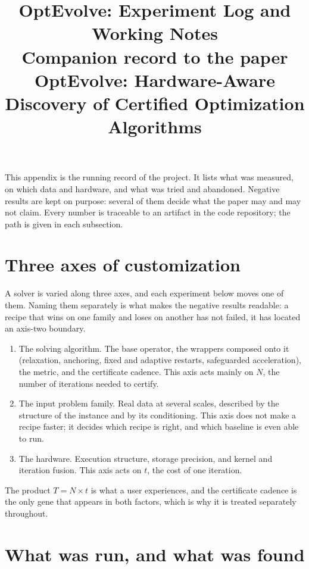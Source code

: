 \documentclass[11pt]{article}
\title{\textbf{OptEvolve: Experiment Log and Working Notes}\\[2mm]
\large Companion record to the paper\\
\large OptEvolve: Hardware-Aware Discovery of Certified Optimization Algorithms}
\date{}
\begin{document}
\maketitle
\label{app:log}

This appendix is the running record of the project. It lists what was
measured, on which data and hardware, and what was tried and abandoned.
Negative results are kept on purpose: several of them decide what the paper
may and may not claim. Every number is traceable to an artifact in the code
repository; the path is given in each subsection.

\tableofcontents
\clearpage

\section{Three axes of customization}
\label{app:log:axes}

A solver is varied along three axes, and each experiment below moves one of
them. Naming them separately is what makes the negative results readable: a
recipe that wins on one family and loses on another has not failed, it has
located an axis-two boundary.

\begin{enumerate}
\item The solving algorithm. The base operator, the wrappers composed onto it
 (relaxation, anchoring, fixed and adaptive restarts, safeguarded
 acceleration), the metric, and the certificate cadence. This axis acts
 mainly on $N$, the number of iterations needed to certify.
\item The input problem family. Real data at several scales, described by the
 structure of the instance and by its conditioning. This axis does not make a
 recipe faster; it decides which recipe is right, and which baseline is even
 able to run.
\item The hardware. Execution structure, storage precision, and kernel and
 iteration fusion. This axis acts on $t$, the cost of one iteration.
\end{enumerate}

The product $T = N \times t$ is what a user experiences, and the certificate
cadence is the only gene that appears in both factors, which is why it is
treated separately throughout.

\section{What was run, and what was found}
\label{app:log:scoreboard}
\end{document}
